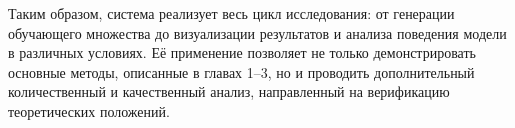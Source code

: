 Таким образом, система реализует весь цикл исследования: от генерации обучающего множества до визуализации результатов и анализа поведения модели в различных условиях. Её применение позволяет не только демонстрировать основные методы, описанные в главах 1–3, но и проводить дополнительный количественный и качественный анализ, направленный на верификацию теоретических положений.
